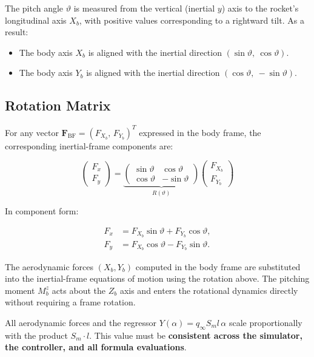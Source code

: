 \documentclass[11pt,a4paper]{article}
\begin{document}
The pitch angle $\vartheta$ is measured from the vertical (inertial $y$) axis to the rocket's longitudinal axis $X_b$, with positive values corresponding to a rightward tilt. As a result:

\begin{itemize}
  \item The body axis $X_b$ is aligned with the inertial direction $(\sin\vartheta,\ \cos\vartheta)$.
  \item The body axis $Y_b$ is aligned with the inertial direction $(\cos\vartheta,\ -\sin\vartheta)$.
\end{itemize}

\subsection{Rotation Matrix}

For any vector $\mathbf{F}_{\mathrm{BF}} = (F_{X_b},\, F_{Y_b})^T$ expressed in the body frame, the corresponding inertial-frame components are:

\begin{equation}
  \begin{pmatrix} F_x \\ F_y \end{pmatrix}
  =
  \underbrace{\begin{pmatrix} \sin\vartheta & \cos\vartheta \\ \cos\vartheta & -\sin\vartheta \end{pmatrix}}_{R(\vartheta)}
  \begin{pmatrix} F_{X_b} \\ F_{Y_b} \end{pmatrix}
\end{equation}

In component form:

\begin{align}
  F_x &= F_{X_b}\sin\vartheta + F_{Y_b}\cos\vartheta, \\
  F_y &= F_{X_b}\cos\vartheta - F_{Y_b}\sin\vartheta.
\end{align}

The aerodynamic forces $(X_b, Y_b)$ computed in the body frame are substituted into the inertial-frame equations of motion using the rotation above. The pitching moment $M_b^z$ acts about the $Z_b$ axis and enters the rotational dynamics directly without requiring a frame rotation.

\bigskip
All aerodynamic forces and the regressor $Y(\alpha) = q_\infty S_m l\,\alpha$ scale proportionally with the product $S_m\cdot l$. This value must be \textbf{consistent across the simulator, the controller, and all formula evaluations}.
\end{document}
